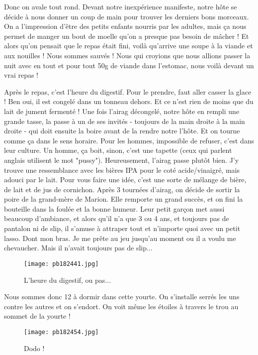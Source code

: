 \documentclass{book}
\begin{document}
Donc on avale tout rond. Devant notre inexpérience manifeste, notre hôte se décide à nous donner un coup de main pour trouver les derniers bons morceaux. On a l'impression d'être des petits enfants nourris par les adultes, mais ça nous permet de manger un bout de moelle qu'on a presque pas besoin de mâcher ! Et alors qu'on pensait que le repas était fini, voilà qu'arrive une soupe à la viande et aux nouilles ! Nous sommes sauvés ! Nous qui croyions que nous allions passer la nuit avec en tout et pour tout 50g de viande dans l'estomac, nous voilà devant un vrai repas !

Après le repas, c'est l'heure du digestif. Pour le prendre, faut aller casser la glace ! Ben oui, il est congelé dans un tonneau dehors. Et ce n'est rien de moins que du lait de jument fermenté ! Une fois l'airag décongelé, notre hôte en rempli une grande tasse, la passe à un de ses invités - toujours de la main droite à la main droite - qui doit ensuite la boire avant de la rendre notre l'hôte. Et on tourne comme ça dans le sens horaire. Pour les hommes, impossible de refuser, c'est dans leur culture. Un homme, ça boit, sinon, c'est une tapette (ceux qui parlent anglais utilisent le mot "pussy"). Heureusement, l'airag passe plutôt bien. J'y trouve une ressemblance avec les bières IPA pour le coté acide/vinaigré, mais adouci par le lait. Pour vous faire une idée, c'est une sorte de mélange de bière, de lait et de jus de cornichon.
Après 3 tournées d'airag, on décide de sortir la poire de la grand-mère de Marion. Elle remporte un grand succès, et on fini la bouteille dans la foulée et la bonne humeur. Leur petit garçon met aussi beaucoup d'ambiance, et alors qu'il n'a que 3 ou 4 ans, et toujours pas de pantalon ni de slip, il s'amuse à attraper tout et n'importe quoi avec un petit lasso. Dont mon bras. Je me prête au jeu jusqu'au moment ou il a voulu me chevaucher. Mais il n'avait toujours pas de slip...


\begin{figure}[h]
\centering
\texttt{[image: pb182441.jpg]}
\caption*{ L'heure du digestif, ou pas...}
\end{figure}

Nous sommes donc 12 à dormir dans cette yourte. On s'installe serrés les uns contre les autres et on s'endort. On voit même les étoiles à travers le trou au sommet de la yourte !


\begin{figure}[h]
\centering
\texttt{[image: pb182454.jpg]}
\caption*{ Dodo !}
\end{figure}
\end{document}

